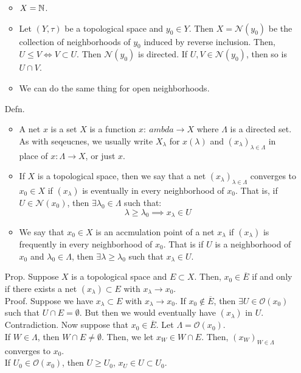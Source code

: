 \documentclass[12pt]{article}
\begin{document}
\begin{itemize}
\begin{itemize}
        \item $X = \mathbb N$. 
        \item Let $(Y, \tau)$ be a topological space and $y_0 \in Y$. Then $X = \mathcal{N}(y_0)$ be the collection of neighborhoods of $y_0$ induced by reverse inclusion. Then, $U \leq V \iff V \subset U$. Then $\mathcal{N}(y_0)$ is directed. If $U, V \in \mathcal{N}(y_0)$, then so is $U \cap V$. 
        \item We can do the same thing for open neighborhoods. 
    \end{itemize} 
    \item[Defn.] \begin{itemize}
        \item A net $x$ is a set $X$ is a function $x: \:ambda \to X$ where $\Lambda$ is a directed set. As with seqeucnes, we usually write $X_\lambda$ for $x(\lambda)$ and $(x_\lambda)_{\lambda \in \Lambda}$ in place of $x: \Lambda \to X$, or just $x$. 
        \item If $X$ is a topological space, then we say that a net $(x_\lambda)_{\lambda \in \Lambda}$ converges to $x_0 \in X$ if $(x_\lambda)$ is eventually in every neighborhood of $x_0$. That is, if $U \in \mathcal{N}(x_0)$, then $\exists \lambda_0 \in \Lambda$ such that: 
        \[ \lambda \geq \lambda_0  \implies x_\lambda \in U \]
        \item We say that $x_0 \in X$ is an accmulation point of a net $x_\lambda$ if $(x_\lambda)$ is frequently in every neighborhood of $x_0$. That is if $U$ is a neighborhood of $x_0$ and $\lambda_0 \in \Lambda$, then $\exists \lambda \geq \lambda_0$ such that $x_\lambda \in U$.
    \end{itemize}
    \item[Prop.] Suppose $X$ is a topological space and $E \subset X$. Then, $x_0 \in \overline{E}$ if and only if there exists a net $(x_\lambda) \subset E$ with $x_\lambda \to x_0$. \\
    Proof. Suppose we have $x_\lambda \subset E$ with $x_\lambda \to x_0$. If $x_0 \not \in \overline{E}$, then $\exists U \in \mathcal{O}(x_0)$ such that $U \cap E = \emptyset$. But then we would eventually have $(x_\lambda)$ in $U$. Contradiction. \bbni
    Now suppose that $x_0 \in \overline{E}$. Let $\Lambda = \mathcal{O}(x_0)$.  \\
    If $W \in \Lambda$, then $W \cap E \neq \emptyset$. Then, we let $x_W \in W \cap E$. Then, $(x_W)_{W \in \Lambda}$ converges to $x_0$. \\
    If $U_0 \in \mathcal{O}(x_0)$, then $U \geq U_0$, $x_U \in U \subset U_0$. 

\end{itemize}
\end{document}
